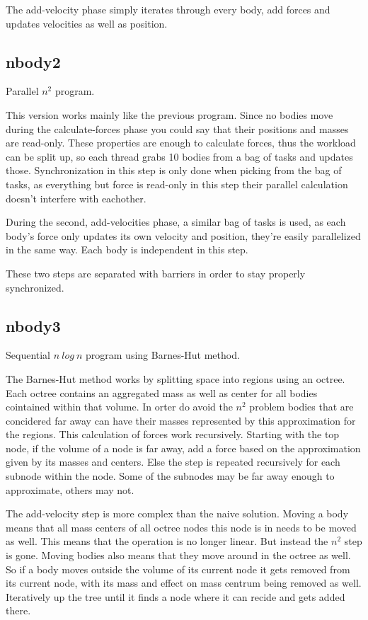 \documentclass[a4paper] {article}
\begin{document}
The add-velocity phase simply iterates through every body, add forces and updates velocities as well as position.

\subsection{nbody2}

Parallel $n^2$ program.

This version works mainly like the previous program. Since no bodies move during the calculate-forces phase you could say that their positions and masses are read-only. These properties are enough to calculate forces, thus the workload can be split up, so each thread grabs 10 bodies from a bag of tasks and updates those. Synchronization in this step is only done when picking from the bag of tasks, as everything but force is read-only in this step their parallel calculation doesn't interfere with eachother.

During the second, add-velocities phase, a similar bag of tasks is used, as each body's force only updates its own velocity and position, they're easily parallelized in the same way. Each body is independent in this step.

These two steps are separated with barriers in order to stay properly synchronized.

\subsection{nbody3}

Sequential $n\ log\ n$ program using Barnes-Hut method.

The Barnes-Hut method works by splitting space into regions using an octree. Each octree contains an aggregated mass as well as center for all bodies cointained within that volume. In orter do avoid the $n^2$ problem bodies that are concidered far away can have their masses represented by this approximation for the regions. This calculation of forces work recursively. Starting with the top node, if the volume of a node is far away, add a force based on the approximation given by its masses and centers. Else the step is repeated recursively for each subnode within the node. Some of the subnodes may be far away enough to approximate, others may not.

The add-velocity step is more complex than the naive solution. Moving a body means that all mass centers of all octree nodes this node is in needs to be moved as well. This means that the operation is no longer linear. But instead the $n^2$ step is gone. Moving bodies also means that they move around in the octree as well. So if a body moves outside the volume of its current node it gets removed from its current node, with its mass and effect on mass centrum being removed as well. Iteratively up the tree until it finds a node where it can recide and gets added there.
\end{document}
